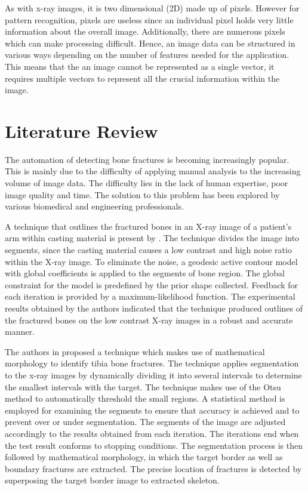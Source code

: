 \documentclass[11pt,twocolumn]{witseiepaper}
\begin{document}
	As with x-ray images, it is two dimensional (2D) made up of pixels. However for pattern recognition, pixels are useless since an individual pixel holds very little information about the overall image. Additionally, there are numerous pixels which can make processing difficult. Hence, an image data can be structured in various ways depending on the number of features needed for the application. This means that the an image cannot be represented as a single vector, it requires multiple vectors to represent all the crucial information within the image.
	
	\section{Literature Review}
	\label{sc: Literature Review}
	The automation of detecting bone fractures is becoming increasingly popular. This is mainly due to the difficulty of applying manual analysis to the increasing volume of image data. The difficulty lies in the lack of human expertise, poor image quality and time. The solution to this problem has been explored by various biomedical and engineering professionals. 
	
	A technique that outlines the fractured bones in an X-ray image of a patient's arm within casting material is present by \cite{Jia_Jiang2006}. The technique divides the image into segments, since the casting material causes a low contrast and high noise ratio within the X-ray image. To eliminate the noise, a geodesic active contour model with global coefficients is applied to the segments of bone region. The global constraint for the model is predefined by the prior shape collected. Feedback for each iteration is provided by a maximum-likelihood function. The experimental results obtained by the authors indicated that the technique produced outlines of the fractured bones on the low contrast X-ray images in a robust and accurate manner.
	
	The authors in \cite{Liang_Pan_Huang_Fan_2010} proposed a technique which makes use of mathematical morphology to identify tibia bone fractures. The technique applies segmentation to the x-ray images by dynamically dividing it into several intervals to determine the smallest intervals with the target. The technique makes use of the Otsu method to automatically threshold the small regions. A statistical method is employed for examining the segments to ensure that accuracy is achieved and to prevent over or under segmentation. The segments of the image are adjusted accordingly to the results obtained from each iteration. The iterations end when the test result conforms to stopping conditions. The segmentation process is then followed by mathematical morphology, in which the target border as well as boundary fractures are extracted. The precise location of fractures is detected by superposing the target border image to extracted skeleton.
	
\end{document}
